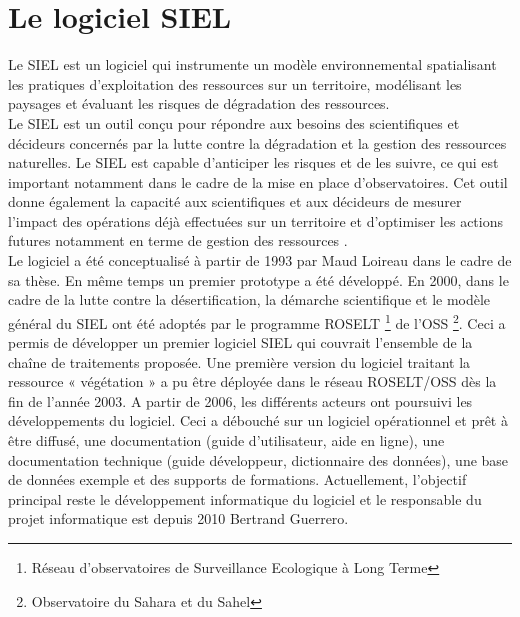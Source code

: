 

\section{Le logiciel SIEL}

Le SIEL est un logiciel qui instrumente un modèle environnemental \citep{Loireau2007} spatialisant les pratiques d'exploitation des ressources sur un territoire, modélisant les paysages et évaluant les risques de dégradation des ressources.\\

Le SIEL est un outil conçu pour répondre aux besoins des scientifiques et décideurs concernés par la lutte contre la dégradation et la gestion des ressources naturelles. Le SIEL est capable d'anticiper les risques et de les suivre, ce qui est important notamment dans le cadre de la mise en place d'observatoires. Cet outil donne également la capacité aux scientifiques et aux décideurs de mesurer l'impact des opérations déjà effectuées sur un territoire et d'optimiser les actions futures notamment en terme de gestion des ressources  \citep{SIEL2012}.\\ 

Le logiciel a été conceptualisé à partir de 1993 par Maud Loireau dans le cadre de sa thèse. En même temps un premier prototype a été développé. En 2000, dans le cadre de la lutte contre la désertification, la démarche scientifique et le modèle général du SIEL ont été adoptés par le programme ROSELT \footnote{Réseau d'observatoires de Surveillance Ecologique à Long Terme} de l’OSS \footnote{Observatoire du Sahara et du Sahel}. Ceci a permis de développer un premier logiciel SIEL qui couvrait l'ensemble de la chaîne de traitements proposée. Une première version du logiciel traitant la ressource « végétation » a pu être déployée dans le réseau ROSELT/OSS dès la fin de l'année 2003.
A partir de 2006, les différents acteurs ont poursuivi les développements du logiciel. Ceci a débouché sur un logiciel opérationnel et prêt à être diffusé, une documentation (guide d'utilisateur, aide en ligne), une documentation technique (guide développeur, dictionnaire des données), une base de données exemple et des supports de formations. Actuellement, l'objectif principal reste le développement informatique du logiciel et le responsable du projet informatique est depuis 2010 Bertrand Guerrero.

